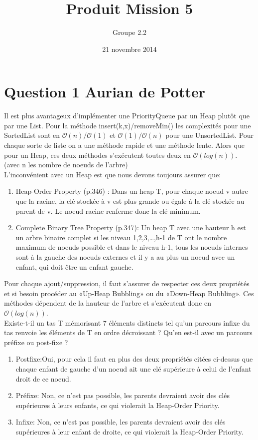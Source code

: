 \documentclass[10pt,a4paper]{article}
\date{21 novembre 2014}
\author{Groupe 2.2}
\title{Produit Mission 5}
\begin{document}
\maketitle

\section*{Question 1 Aurian de Potter}
Il est plus avantageux d'implémenter une PriorityQueue par un Heap plutôt que par une List. Pour la méthode insert(k,x)/removeMin() les complexités pour une SortedList sont en $\mathcal{O}(n)/\mathcal{O}(1)$ et $\mathcal{O}(1)/\mathcal{O}(n)$ pour une UnsortedList. Pour chaque sorte de liste on a une méthode rapide et une méthode lente. Alors que pour un Heap, ces deux méthodes s'exécutent toutes deux en $\mathcal{O}(log(n))$. (avec n les nombre de noeuds de l'arbre)\\

L'inconvénient avec un Heap est que nous devons toujours assurer que: 
\begin{enumerate}
\item Heap-Order Property (p.346) : Dans un heap T, pour chaque noeud v autre que la racine, la clé stockée à v est plus grande ou égale à la clé stockée au parent de v. Le noeud racine renferme donc la clé minimum.
\item Complete Binary Tree Property (p.347): Un heap T avec une hauteur h est un arbre binaire complet si les niveau 1,2,3,…,h-1 de T ont le nombre maximum de noeuds possible et dans le niveau h-1, tous les noeuds internes sont à la gauche des noeuds externes et il y a au plus un noeud avec un enfant, qui doit être un enfant gauche.
\end{enumerate}
Pour chaque ajout/suppression, il faut s'assurer de respecter ces deux propriétés et si besoin procéder au «Up-Heap Bubbling» ou du «Down-Heap Bubbling». Ces méthodes dépendent de la hauteur de l'arbre et s'exécutent donc en $\mathcal{O}(log(n))$.\\

Existe-t-il un tas T mémorisant 7 éléments distincts tel qu'un parcours infixe du
tas renvoie les éléments de T en ordre décroissant ? Qu'en est-il avec un parcours
préfixe ou post-fixe ?

\begin{enumerate}
\item{Postfixe}:Oui, pour cela il faut en plus des deux propriétés citées ci-dessus que chaque enfant de gauche d'un noeud ait une clé supérieure à celui de l'enfant droit de ce noeud.
\item{Préfixe}: Non, ce n'est pas possible, les parents devraient avoir des clés supérieures à leurs enfants, ce qui violerait la Heap-Order Priority.
\item{Infixe}: Non, ce n'est pas possible, les parents devraient avoir des clés supérieures à leur enfant de droite, ce qui violerait la Heap-Order Priority.
\end{enumerate}
\end{document}
